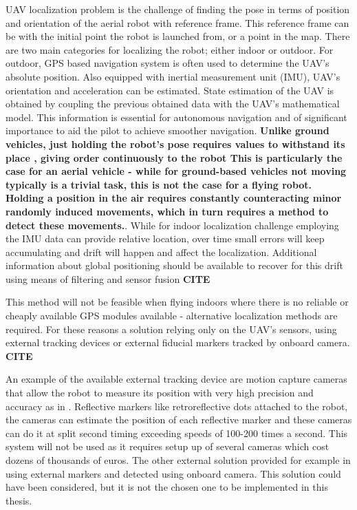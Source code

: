 UAV localization problem is the challenge of finding the pose in terms of position and orientation of the aerial robot with reference frame. This reference frame can be with the initial point the robot is launched from, or a point in the map. There are two main categories for localizing the robot; either indoor or outdoor. For outdoor, GPS based navigation system is often used to determine the UAV’s absolute position. Also equipped with inertial measurement unit (IMU), UAV's orientation and acceleration can be estimated. State estimation of the UAV is obtained by coupling the previous obtained data with the UAV's mathematical model. This information is essential for autonomous navigation and of significant importance to aid the pilot to achieve smoother navigation. \textbf{Unlike ground vehicles, just holding the robot's pose requires values to withstand its place , giving order continuously to the robot   This is particularly the case for an aerial vehicle - while for ground-based vehicles not moving typically is a trivial task, this is not the case for a flying robot. Holding a position in the air requires constantly counteracting minor randomly induced movements, which in turn requires a method to detect these movements.}.
While for indoor localization challenge employing the IMU data can provide relative location, over time small errors will keep accumulating and drift will happen and affect the localization. Additional information about global positioning should be available to recover for this drift using means of filtering and sensor fusion \textbf{CITE} 

 This method will not be feasible when flying indoors where there is no reliable or cheaply available GPS modules available - alternative localization methods are required. For these reasons a solution  relying only on the UAV's sensors, using external tracking devices or external fiducial markers tracked by onboard camera. \textbf{CITE} 
 

An example of the available external tracking device are motion capture cameras that allow the robot to measure its position with very high precision and accuracy as in \cite{michael2010grasp}. Reflective markers like retroreflective dots attached to the robot, the cameras can estimate the position of each reflective marker and these cameras can do it at split second timing exceeding speeds of 100-200 times a second. This system will not be used as it requires setup up of several cameras which cost dozens of thousands of euros. The other external solution provided for example in  \cite{meier2012pixhawk} using external markers and detected using onboard camera. This solution could have been considered, but it is not the chosen one to be implemented in this thesis. 
 
